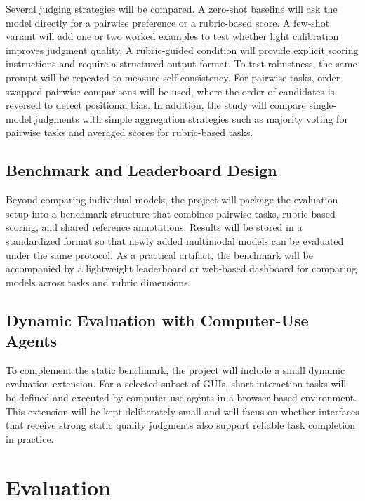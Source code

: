 \documentclass[pdflatex,sn-mathphys-num]{sn-jnl}
\begin{document}
Several judging strategies will be compared. A zero-shot baseline will ask the model
directly for a pairwise preference or a rubric-based score. A few-shot variant will add
one or two worked examples to test whether light calibration improves judgment quality.
A rubric-guided condition will provide explicit scoring instructions and require a
structured output format. To test robustness, the same prompt will be repeated to
measure self-consistency. For pairwise tasks, order-swapped pairwise comparisons will
be used, where the order of candidates is reversed to detect positional bias. In
addition, the study will compare single-model judgments with simple aggregation
strategies such as majority voting for pairwise tasks and averaged scores for
rubric-based tasks.

\subsection{Benchmark and Leaderboard Design}

Beyond comparing individual models, the project will package the evaluation setup into
a benchmark structure that combines pairwise tasks, rubric-based scoring, and shared
reference annotations. Results will be stored in a standardized format so that newly
added multimodal models can be evaluated under the same protocol. As a practical
artifact, the benchmark will be accompanied by a lightweight leaderboard or web-based
dashboard for comparing models across tasks and rubric dimensions.

\subsection{Dynamic Evaluation with Computer-Use Agents}

To complement the static benchmark, the project will include a small dynamic evaluation
extension. For a selected subset of GUIs, short interaction tasks will be defined and
executed by computer-use agents in a browser-based environment. This extension will be
kept deliberately small and will focus on whether interfaces that receive strong static
quality judgments also support reliable task completion in practice.

\section{Evaluation}\label{sec:evaluation}
\end{document}
